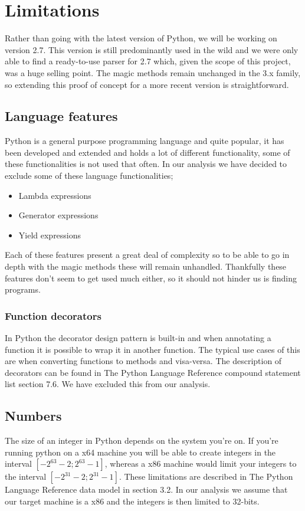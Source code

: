 \chapter{Limitations}

Rather than going with the latest version of Python, we will be working on version 2.7. This version is still predominantly used in the wild and we were only able to find a ready-to-use parser for 2.7 which, given the scope of this project, was a huge selling point. The magic methods remain unchanged in the 3.x family, so extending this proof of concept for a more recent version is straightforward.

\section{Language features}
Python is a general purpose programming language and quite popular, it has been developed and extended and holds a lot of different functionality, some of these functionalities is not used that often. In our analysis we have decided to exclude some of these language functionalities;

\begin{itemize}
	\item Lambda expressions
	\item Generator expressions
	\item Yield expressions
\end{itemize}

Each of these features present a great deal of complexity so to be able to go in depth with the magic methods these will remain unhandled. Thankfully these features don't seem to get used much either, so it should not hinder us is finding programs.


\subsection{Function decorators}
In Python the decorator design pattern is built-in and when annotating a function it is possible to wrap it in another function. The typical use cases of this are when converting functions to methods and visa-versa. The description of decorators can be found in The Python Language Reference compound statement list\cite{pyref.compound} section 7.6. We have excluded this from our analysis.

\section{Numbers}
The size of an integer in Python depends on the system you're on. If you're running python on a x64 machine you will be able to create integers in the interval $[-2^{63}-2;2^{63}-1]$, whereas a x86 machine would limit your integers to the interval $[-2^{31}-2;2^{31}-1]$. These limitations are described in The Python Language Reference data model\cite{pyref.datamodel} in section 3.2. In our analysis we assume that our target machine is a x86 and the integers is then limited to 32-bits.

